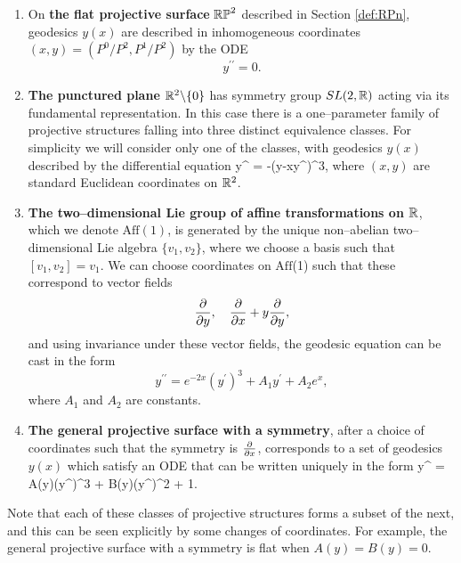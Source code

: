 \begin{enumerate}
\item On {\bf the flat projective surface} $\mathbb{RP}^2$ described in Section \ref{def:RPn}, geodesics $y(x)$ are described in inhomogeneous coordinates $(x,y)=({P^0}/{P^2},{P^1}/{P^2})$ by the ODE
\[
y^{\prime\prime}=0.
\]
\item {\bf The punctured plane $\mathbb{R}^2\backslash\{0\}$} has symmetry group $SL(2,\mathbb{R})$ acting via its fundamental representation. In this case there is a one--parameter family of projective structures falling into three distinct equivalence classes. For simplicity we will consider only one of the classes, with geodesics $y(x)$ described by the differential equation
\be \label{eq:submaxODE}
y^{\prime\prime} = -(y-xy^\prime)^3,
\ee
where $(x,y)$ are standard Euclidean coordinates on $\mathbb{R}^2$.
\item {\bf The two--dimensional Lie group of affine transformations on $\mathbb{R}$}, which we denote $\mathrm{Aff}(1)$, is generated by the unique non--abelian two--dimensional Lie algebra $\{v_1,v_2\}$, where we choose a basis such that $[v_1,v_2]=v_1$. We can choose coordinates on $\mathrm{Aff}$(1) such that these correspond to vector fields
\[
\frac{\partial}{\partial y},\quad \frac{\partial}{\partial x} + y\frac{\partial}{\partial y},
\]
and using invariance under these vector fields, the geodesic equation can be cast in the form \cite{FLL}
\[
y^{\prime\prime} = e^{-2x}(y^\prime)^3 + A_1y^\prime + A_2e^x,
\]
where $A_1$ and $A_2$ are constants.
\item {\bf The general projective surface with a symmetry}, after a choice of coordinates such that the symmetry is $\frac{\partial}{\partial x}$, corresponds to a set of geodesics $y(x)$ which satisfy an ODE that can be written uniquely in the form \cite{FLL}
\be \label{eq:1symode}
y^{\prime\prime} = A(y)(y^\prime)^3 + B(y)(y^\prime)^2 + 1.
\ee
\end{enumerate}

Note that each of these classes of projective structures forms a subset of the next, and this can be seen explicitly by some changes of coordinates. For example, the general projective surface with a symmetry is flat when $A(y)=B(y)=0$.

